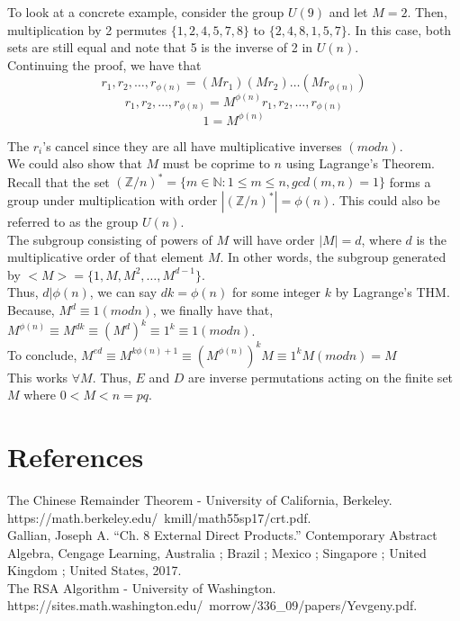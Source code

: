 \documentclass{article}
\begin{document}
To look at a concrete example, consider the group $U(9)$ and let $M = 2$. Then, multiplication by 2 permutes $\{1,2,4,5,7,8\}$ to $\{2,4,8,1,5,7\}$. In this case, both sets are still equal and note that 5 is the inverse of 2 in $U(n)$. \\

Continuing the proof, we have that 
$$r_1,r_2,\ldots,r_{\phi(n)} = (Mr_1)(Mr_2)\ldots(Mr_{\phi(n)})$$ 
$$r_1,r_2,\ldots,r_{\phi(n)} = M^{\phi(n)}r_1,r_2,\ldots,r_{\phi(n)}$$
$$1 = M^{\phi(n)}$$ 

The $r_i$'s cancel since they are all have multiplicative inverses $(modn)$. \\

We could also show that $M$ must be coprime to $n$ using Lagrange's Theorem.  \\

Recall that the set $(\mathbb{Z}/n)^* = \{ m \in \mathbb{N}: 1 \leq m \leq n, gcd(m,n) =1 \}$  forms a group under multiplication with order $|(\mathbb{Z}/n)^*| = \phi(n)$. This could also be referred to as the group $U(n)$.\\

The subgroup consisting of powers of $M$ will have order $|M|= d$, where $d$ is the multiplicative order of that element $M$. In other words, the subgroup generated by $<M> = \{1,M,M^2,\ldots,M^{d-1}\}$. \\

Thus, $d | \phi(n)$, we can say $dk = \phi(n)$ for some integer $k$ by Lagrange's THM. \\

Because, $M^d \equiv 1 (modn)$, we finally have that, $M^{\phi(n)} \equiv M^{dk} \equiv (M^d)^k \equiv 1^k \equiv 1(modn)$. \\

To conclude, $M^{ed} \equiv M^{k\phi(n)+1} \equiv (M^{\phi(n)})^kM \equiv 1^kM(modn) = M$ \\

This works $\forall M$. Thus, $E$ and $D$ are inverse permutations acting on the finite set $M$ where $0 < M < n = pq$.

\section{References}
\indent \indent The Chinese Remainder Theorem - University of California, Berkeley. \\ https://math.berkeley.edu/~kmill/math55sp17/crt.pdf. \\

Gallian, Joseph A. “Ch. 8 External Direct Products.” Contemporary Abstract Algebra, Cengage Learning, Australia ; Brazil ; Mexico ; Singapore ; United Kingdom ; United States, 2017. \\

The RSA Algorithm - University of Washington. \\ https://sites.math.washington.edu/~morrow/336_09/papers/Yevgeny.pdf. 
\end{document}
